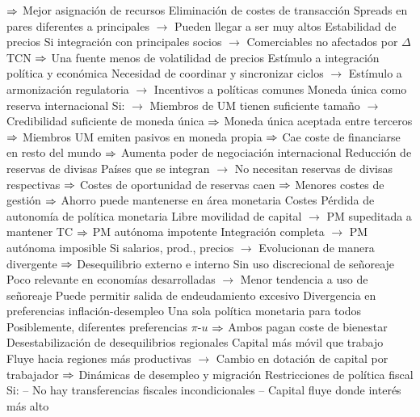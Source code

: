 \documentclass{nuevotema}
\begin{document}
\begin{esquemal}
				\4[] $\Rightarrow$ Mejor asignación de recursos
				 Eliminación de costes de transacción
				\4[] Spreads en pares diferentes a principales
				\4[] $\to$ Pueden llegar a ser muy altos
				\4[\textsc{iv}] Estabilidad de precios
				\4[] Si integración con principales socios
				\4[] $\to$ Comerciables no afectados por $\Delta$ TCN
				\4[] $\Rightarrow$ Una fuente menos de volatilidad de precios
				\4[\textsc{v}] Estímulo a integración política y económica
				\4[] Necesidad de coordinar y sincronizar ciclos
				\4[] $\to$ Estímulo a armonización regulatoria
				\4[] $\to$ Incentivos a políticas comunes
				\4[\textsc{vi}] Moneda única como reserva internacional
				\4[] Si:
				\4[] $\to$ Miembros de UM tienen suficiente tamaño
				\4[] $\to$ Credibilidad suficiente de moneda única
				\4[] $\Rightarrow$ Moneda única aceptada entre terceros
				\4[] $\Rightarrow$ Miembros UM emiten pasivos en moneda propia
				\4[] $\Rightarrow$ Cae coste de financiarse en resto del mundo
				\4[] $\Rightarrow$ Aumenta poder de negociación internacional
				 Reducción de reservas de divisas
				\4[] Países que se integran
				\4[] $\to$ No necesitan reservas de divisas respectivas
				\4[] $\Rightarrow$ Costes de oportunidad de reservas caen
				\4[] $\Rightarrow$ Menores costes de gestión
				\4[] $\Rightarrow$ Ahorro puede mantenerse en área monetaria
			\3 Costes
				\4[\textsc{i}] Pérdida de autonomía de política monetaria
				\4[] Libre movilidad de capital
				\4[] $\to$ PM supeditada a mantener TC
				\4[] $\Rightarrow$ PM autónoma impotente
				\4[] Integración completa
				\4[] $\to$ PM autónoma imposible
				\4[] Si salarios, prod., precios
				\4[] $\to$ Evolucionan de manera divergente
				\4[] $\Rightarrow$ Desequilibrio externo e interno
				\4[\textsc{ii}] Sin uso discrecional de señoreaje
				\4[] Poco relevante en economías desarrolladas
				\4[] $\to$ Menor tendencia a uso de señoreaje
				\4[] Puede permitir salida de endeudamiento excesivo
				 Divergencia en preferencias inflación-desempleo
				\4[] Una sola política monetaria para todos
				\4[] Posiblemente, diferentes preferencias $\pi$-$u$
				\4[] $\Rightarrow$ Ambos pagan coste de bienestar
				\4[\textsc{iv}] Desestabilización de desequilibrios regionales
				\4[] Capital más móvil que trabajo
				\4[] Fluye hacia regiones más productivas
				\4[] $\to$ Cambio en dotación de capital por trabajador
				\4[] $\Rightarrow$ Dinámicas de desempleo y migración
				\4[\textsc{v}] Restricciones de política fiscal
				\4[] Si:
				\4[] -- No hay transferencias fiscales incondicionales
				\4[] -- Capital fluye donde interés más alto

\end{esquemal}
\end{document}
